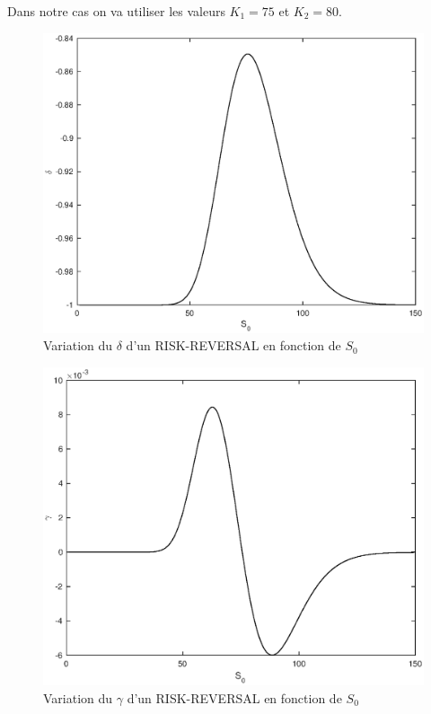 Dans notre cas on va utiliser les valeurs $K_{1}=75$ et $K_{2}=80$.

\begin{figure}[H]
\centering
\includegraphics[scale=0.6]{./img/DELTA_S0.eps}
\caption{Variation du $\delta$ d'un RISK-REVERSAL en fonction de $S_0$}
\label{fig:delta_call_euro}
\end{figure}

\begin{figure}[H]
\centering
\includegraphics[scale=0.6]{./img/GAMMA_S0.eps}
\caption{Variation du $\gamma$ d'un RISK-REVERSAL en fonction de $S_0$}
\label{fig:gamma_call_euro}
\end{figure}

